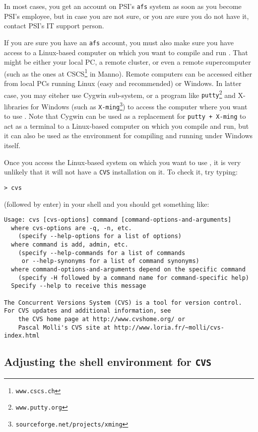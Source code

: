 In most cases, you get an account on PSI's {\tt afs} system as soon as you
become PSI's employee, but in case you are not sure, or you are sure 
you do not have it, contact PSI's IT support person.

If you are sure you have an {\tt afs} account, you must also make sure you
have access to a Linux-based computer on which you want to compile 
and run {\psiboil}. That might be either your local PC, a remote cluster, 
or even a remote supercomputer (such as the ones at CSCS\footnote{\tt www.cscs.ch} 
in Manno). 
Remote computers can be accessed either from local PCs running Linux 
(easy and recommended) or Windows. In latter case, you may eiteher use
Cygwin sub-system, or a
program like {\tt putty\footnote{\tt www.putty.org}} and X-libraries for Windows 
(such as {\tt X-ming\footnote{\tt sourceforge.net/projects/xming}}) to
access the computer where you want to use {\psiboil}. Note that Cygwin can
be used as a replacement for {\tt putty + X-ming} to act as a terminal
to a Linux-based computer on which you compile and run, but it can also
be used as the environment for compiling and running under Windows itself. 

Once you access the Linux-based system on which you want to use {\psiboil},
it is very unlikely that it will not have a {\tt CVS} installation on it. 
To check it, try typing:
%
\begin{verbatim}
> cvs
\end{verbatim}
%
(followed by enter) in your shell and you should get something like:
%
{\small \begin{verbatim}
Usage: cvs [cvs-options] command [command-options-and-arguments]
  where cvs-options are -q, -n, etc.
    (specify --help-options for a list of options)
  where command is add, admin, etc.
    (specify --help-commands for a list of commands
     or --help-synonyms for a list of command synonyms)
  where command-options-and-arguments depend on the specific command
    (specify -H followed by a command name for command-specific help)
  Specify --help to receive this message

The Concurrent Versions System (CVS) is a tool for version control.
For CVS updates and additional information, see
    the CVS home page at http://www.cvshome.org/ or
    Pascal Molli's CVS site at http://www.loria.fr/~molli/cvs-index.html
\end{verbatim}}

\subsection{Adjusting the shell environment for {\tt CVS}}

